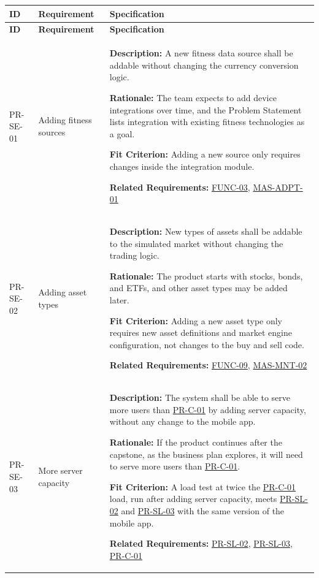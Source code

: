 \documentclass[12pt]{article}
\begin{document}
\small
\setlength{\tabcolsep}{4pt}
\begin{xltabular}{\textwidth}{|p{2.6cm}|p{3.4cm}|X|}
\hline
\textbf{ID} & \textbf{Requirement} & \textbf{Specification} \\
\hline
\endfirsthead
\hline
\textbf{ID} & \textbf{Requirement} & \textbf{Specification} \\
\hline
\endhead

PR-SE-01\hypertarget{req:PR-SE-01}{} &
Adding fitness sources &
\textbf{Description:} A new fitness data source shall be addable without changing the currency conversion logic.

\textbf{Rationale:} The team expects to add device integrations over time, and the Problem Statement lists integration with existing fitness technologies as a goal.

\textbf{Fit Criterion:} Adding a new source only requires changes inside the integration module.

\textbf{Related Requirements:} \hyperlink{req:FUNC-03}{FUNC-03}, \hyperlink{req:MAS-ADPT-01}{MAS-ADPT-01}\\
\hline

PR-SE-02\hypertarget{req:PR-SE-02}{} &
Adding asset types &
\textbf{Description:} New types of assets shall be addable to the simulated market without changing the trading logic.

\textbf{Rationale:} The product starts with stocks, bonds, and ETFs, and other asset types may be added later.

\textbf{Fit Criterion:} Adding a new asset type only requires new asset definitions and market engine configuration, not changes to the buy and sell code.

\textbf{Related Requirements:} \hyperlink{req:FUNC-09}{FUNC-09}, \hyperlink{req:MAS-MNT-02}{MAS-MNT-02}\\
\hline

PR-SE-03\hypertarget{req:PR-SE-03}{} &
More server capacity &
\textbf{Description:} The system shall be able to serve more users than \hyperlink{req:PR-C-01}{PR-C-01} by adding server capacity, without any change to the mobile app.

\textbf{Rationale:} If the product continues after the capstone, as the business plan explores, it will need to serve more users than \hyperlink{req:PR-C-01}{PR-C-01}.

\textbf{Fit Criterion:} A load test at twice the \hyperlink{req:PR-C-01}{PR-C-01} load, run after adding server capacity, meets \hyperlink{req:PR-SL-02}{PR-SL-02} and \hyperlink{req:PR-SL-03}{PR-SL-03} with the same version of the mobile app.

\textbf{Related Requirements:} \hyperlink{req:PR-SL-02}{PR-SL-02}, \hyperlink{req:PR-SL-03}{PR-SL-03}, \hyperlink{req:PR-C-01}{PR-C-01}\\
\hline

\end{xltabular}
\end{document}
